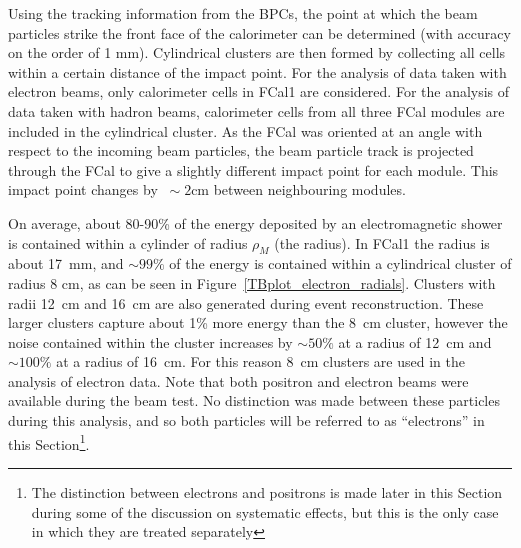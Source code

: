 








%
%

Using the tracking information from the BPCs, the point at which the beam particles strike the front face of the calorimeter can be determined (with accuracy on the order of 1 mm). Cylindrical clusters are then formed by collecting all cells within a certain distance of the impact point. For the analysis of data taken with electron beams, only calorimeter cells in FCal1 are considered. For the analysis of data taken with hadron beams, calorimeter cells from all three FCal modules are included in the cylindrical cluster. As the FCal was oriented at an angle with respect to the incoming beam particles, the beam particle track is projected through the FCal to give a slightly different impact point for each module. This impact point changes by $~\sim2$cm between neighbouring modules.

%
%
%
%

On average, about 80-90\% of the energy deposited by an electromagnetic shower is contained within a cylinder of radius $\rho_M$ (the \moliere radius). In FCal1 the \moliere radius is about 17~mm, and $\sim 99\%$ of the energy is contained within a cylindrical cluster of radius 8 cm, as can be seen in Figure~\ref{TBplot_electron_radials}. Clusters with radii 12~cm and 16~cm are also generated during event reconstruction. These larger clusters capture about 1\% more energy than the 8~cm cluster, however the noise contained within the cluster increases by $\sim50 \%$ at a radius of 12~cm and  $\sim100 \%$ at a radius of 16~cm. For this reason 8~cm clusters are used in the analysis of electron data. Note that both positron and electron beams were available during the beam test. No distinction was made between these particles during this analysis, and so both particles will be referred to as ``electrons'' in this Section\footnote{The distinction between electrons and positrons is made later in this Section during some of the discussion on systematic effects, but this is the only case in which they are treated separately}. 



